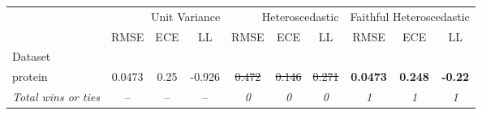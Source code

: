 \begin{tabular}{l|ccc|ccc|ccc}
\toprule
{} & \multicolumn{3}{r}{Unit Variance} & \multicolumn{3}{r}{Heteroscedastic} & \multicolumn{3}{r}{Faithful Heteroscedastic} \\
{} & {RMSE} & {ECE} & {LL} & {RMSE} & {ECE} & {LL} & {RMSE} & {ECE} & {LL} \\
{Dataset} & {} & {} & {} & {} & {} & {} & {} & {} & {} \\
\midrule
protein & 0.0473 & 0.25 & -0.926 & \sout{0.472} & \sout{0.146} & \sout{0.271} & \textbf{0.0473} & \textbf{0.248} & \textbf{-0.22} \\
\textit{{Total wins or ties}} & -- & -- & -- & \textit{0} & \textit{0} & \textit{0} & \textit{1} & \textit{1} & \textit{1} \\
\bottomrule
\end{tabular}
